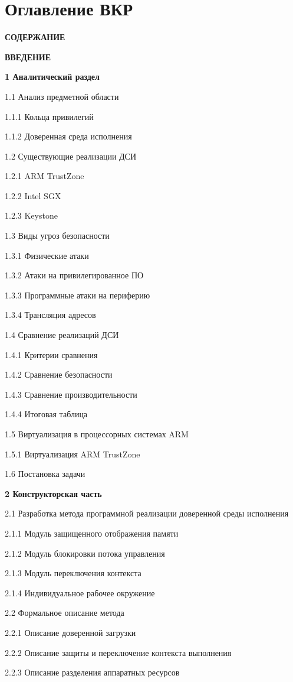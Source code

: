 \section{Оглавление ВКР}

\textbf{СОДЕРЖАНИЕ}

\textbf{ВВЕДЕНИЕ}

\textbf{1 Аналитический раздел}

1.1 Анализ предметной области

1.1.1 Кольца привилегий

1.1.2 Доверенная среда исполнения

1.2 Существующие реализации ДСИ

1.2.1 ARM TrustZone

1.2.2 Intel SGX 

1.2.3 Keystone

1.3 Виды угроз безопасности

1.3.1 Физические атаки 

1.3.2 Атаки на привилегированное ПО

1.3.3 Программные атаки на периферию

1.3.4 Трансляция адресов

1.4 Сравнение реализаций ДСИ

1.4.1 Критерии сравнения 

1.4.2 Сравнение безопасности 

1.4.3 Сравнение производительности

1.4.4 Итоговая таблица

1.5 Виртуализация в процессорных системах ARM

1.5.1 Виртуализация ARM TrustZone

1.6 Постановка задачи

\textbf{2 Конструкторская часть}

2.1 Разработка метода программной реализации доверенной среды исполнения

2.1.1 Модуль защищенного отображения памяти

2.1.2 Модуль блокировки потока управления

2.1.3 Модуль переключения контекста

2.1.4 Индивидуальное рабочее окружение

2.2 Формальное описание метода

2.2.1 Описание доверенной загрузки

2.2.2 Описание защиты и переключение контекста выполнения

2.2.3 Описание разделения аппаратных ресурсов

